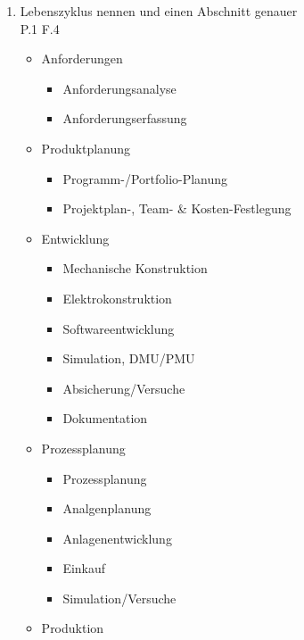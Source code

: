 \documentclass[10pt,a4paper,fleqn]{article}
\begin{document}
\begin{enumerate}
\section{Virtuelle Produktentwicklung}
\subsection{Produktentwicklung - Einleitung}
\item Lebenszyklus nennen und einen Abschnitt genauer \\
	P.1 F.4
		\begin{itemize}
			\item Anforderungen
				\begin{itemize}
					\item Anforderungsanalyse
					\item Anforderungserfassung
				\end{itemize}
			\item Produktplanung
				\begin{itemize}
					\item Programm-/Portfolio-Planung
					\item Projektplan-, Team- \& Kosten-Festlegung
				\end{itemize}
			\item Entwicklung
				\begin{itemize}
					\item Mechanische Konstruktion
					\item Elektrokonstruktion
					\item Softwareentwicklung
					\item Simulation, DMU/PMU
					\item Absicherung/Versuche
					\item Dokumentation
				\end{itemize}
			\item Prozessplanung
				\begin{itemize}
					\item Prozessplanung
					\item Analgenplanung
					\item Anlagenentwicklung
					\item Einkauf
					\item Simulation/Versuche
				\end{itemize}
			\item Produktion
				\begin{itemize}

\end{itemize}
\end{itemize}
\end{enumerate}
\end{document}
